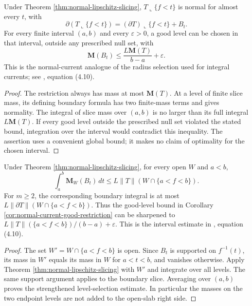 \begin{corollary}\label{cor:normal-current-good-restriction}
Under Theorem \ref{thm:normal-lipschitz-slicing}, $T\llcorner\{f<t\}$ is normal for almost every $t$, with
\[
 \partial(T\llcorner\{f<t\})=(\partial T)\llcorner\{f<t\}+B_t.
\]
For every finite interval $(a,b)$ and every $\varepsilon>0$, a good level can be chosen in that interval, outside any prescribed null set, with
\[
 \mathbf M(B_t)\leq\frac{L\mathbf M(T)}{b-a}+\varepsilon.
\]
This is the normal-current analogue of the radius selection used for integral currents; see \cite{Sim18}, equation (4.10).
\end{corollary}
\begin{proof}
The restriction always has mass at most $\mathbf M(T)$. At a level of finite slice mass, its defining boundary formula has two finite-mass terms and gives normality. The integral of slice mass over $(a,b)$ is no larger than its full integral $L\mathbf M(T)$. If every good level outside the prescribed null set violated the stated bound, integration over the interval would contradict this inequality. The assertion uses a convenient global bound; it makes no claim of optimality for the chosen interval.
\end{proof}

\begin{corollary}\label{cor:normal-slice-interval-mass}
Under Theorem \ref{thm:normal-lipschitz-slicing}, for every open $W$ and $a<b$,
\[
 \int_a^b\mathbf M_W(B_t)\,dt
 \leq L\|T\|(W\cap\{a<f<b\}).
\]
For $m\geq2$, the corresponding boundary integral is at most $L\|\partial T\|(W\cap\{a<f<b\})$. Thus the good-level bound in Corollary \ref{cor:normal-current-good-restriction} can be sharpened to
$L\|T\|(\{a<f<b\})/(b-a)+\varepsilon$.
This is the interval estimate in \cite{Sim18}, equation (4.10).
\end{corollary}
\begin{proof}
The set $W'=W\cap\{a<f<b\}$ is open. Since $B_t$ is supported on $f^{-1}(t)$, its mass in $W'$ equals its mass in $W$ for $a<t<b$, and vanishes otherwise. Apply Theorem \ref{thm:normal-lipschitz-slicing} with $W'$ and integrate over all levels. The same support argument applies to the boundary slice. Averaging over $(a,b)$ proves the strengthened level-selection estimate. In particular the masses on the two endpoint levels are not added to the open-slab right side.
\end{proof}

